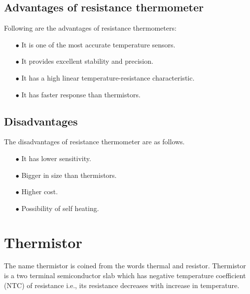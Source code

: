 \subsection{Advantages of resistance thermometer}\label{sec8.8.2}

Following are the advantages of resistance thermometers:
\begin{itemize}
\item[$\bullet$] It is one of the most accurate temperature sensors.

\item[$\bullet$] It provides excellent stability and precision. 

\item[$\bullet$] It has a high linear temperature-resistance characteristic.

\item[$\bullet$] It has faster response than thermistors. 
\end{itemize}

\subsection{Disadvantages}\label{sec8.8.3}

The disadvantages of resistance thermometer are as follows.
\begin{itemize}
\item[$\bullet$] It has lower sensitivity.

\item[$\bullet$] Bigger in size than thermistors.

\item[$\bullet$] Higher cost.

\item[$\bullet$] Possibility of self heating.
\end{itemize}

\section{Thermistor}\label{sec8.9}

The name thermistor is coined from the words thermal and resistor. Thermistor is a two terminal semiconductor slab which has negative temperature coefficient (NTC) of resistance i.e., its resistance decreases with increase in temperature.


